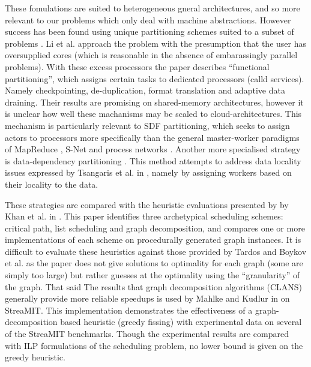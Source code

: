 These fomulations are suited to heterogeneous gneral architectures, and so more relevant to our problems which only deal with machine abstractions.
However success has been found using unique partitioning schemes suited to a subset of problems \cite{dea08, li10, tsa09}.
Li et al. approach the problem with the presumption that the user has oversupplied cores \cite{li10} (which is reasonable in the absence of embarassingly parallel problems).
With these excess processors the paper describes ``functional partitioning'', which assigns certain tasks to dedicated processors (calld services).
Namely checkpointing, de-duplication, format translation and adaptive data draining.
Their results are promising on shared-memory architectures, however it is unclear how well these machanisms may be scaled to cloud-architectures.
This mechanism is particularly relevant to SDF partitioning, which seeks to assign actors to processors more specifically than the general master-worker paradigms of MapReduce \cite{dea08}, S-Net \cite{pen09} and process networks \cite{par03}.
Another more specialised strategy is data-dependency partitioning \cite{dea08}.
This method attempts to address data locality issues expressed by Tsangaris et al. in \cite{tsa09}, namely by assigning workers based on their locality to the data.

These strategies are compared with the heuristic evaluations presented by \cite{len87, boy01} by Khan et al. in \cite{kha94}.
This paper identifies three archetypical scheduling schemes: critical path, list scheduling and graph decomposition, and compares one or more implementations of each scheme on procedurally generated graph instances.
It is difficult to evaluate these heuristics against those provided by Tardos \cite{len87} and Boykov et al. \cite{boy01} as the paper does not give solutions to optimality for each graph (some are simply too large) but rather guesses at the optimality using the ``granularity'' of the graph.
That said The results that graph decomposition algorithms (CLANS) generally provide more reliable speedups \cite{kha94} is used by Mahlke and Kudlur in \cite{mal08} on StreaMIT.
This implementation demonstrates the effectiveness of a graph-decomposition based heuristic (greedy fissing) with experimental data on several of the StreaMIT benchmarks.
Though the experimental results are compared with ILP formulations of the scheduling problem, no lower bound is given on the greedy heuristic.

